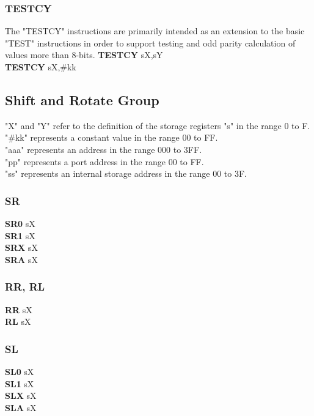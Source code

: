 {        \subsubsection{TESTCY}
            The "TESTCY" instructions are primarily intended as an extension to the basic "TEST" instructions in order to support testing and odd parity calculation of
            values more than 8-bits.
            \textbf{TESTCY} sX,sY\\
            \textbf{TESTCY} sX,\#kk\\
        \subsection{Shift and Rotate Group}
            "X" and "Y" refer to the definition of the storage registers "s" in the range 0 to F.\\
            "\#kk" represents a constant value in the range 00 to FF.\\
            "aaa" represents an address in the range 000 to 3FF.\\
            "pp" represents a port address in the range 00 to FF.\\
            "ss" represents an internal storage address in the range 00 to 3F.\\
                \subsubsection{SR}
                    \textbf{SR0} sX\\
                    \textbf{SR1} sX\\
                    \textbf{SRX} sX\\
                    \textbf{SRA} sX\\
                \subsubsection{RR, RL}
                    \textbf{RR}  sX\\
                    \textbf{RL}  sX\\
                \subsubsection{SL}
                    \textbf{SL0} sX\\
                    \textbf{SL1} sX\\
                    \textbf{SLX} sX\\
                    \textbf{SLA} sX\\
}
